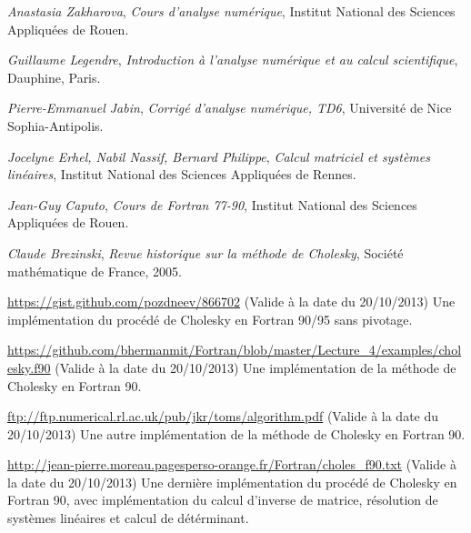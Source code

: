 \documentclass[a4paper, titlepage]{livret}													%
\begin{document}
\begin{thebibliography}{9}

		\emph{Anastasia Zakharova},
		\textit{Cours d'analyse numérique},
		Institut National des Sciences Appliquées de Rouen.

		\emph{Guillaume Legendre},
		\textit{Introduction à l'analyse numérique et au calcul scientifique},
		Dauphine, Paris.

		\emph{Pierre-Emmanuel Jabin},
		\textit{Corrigé d'analyse numérique, TD6},
		Université de Nice Sophia-Antipolis.

		\emph{Jocelyne Erhel, Nabil Nassif, Bernard Philippe},
		\textit{Calcul matriciel et systèmes linéaires},
		Institut National des Sciences Appliquées de Rennes.

		\emph{Jean-Guy Caputo},
		\textit{Cours de Fortran 77-90},
		Institut National des Sciences Appliquées de Rouen.

		\emph{Claude Brezinski},
		\textit{Revue historique sur la méthode de Cholesky},
		Société mathématique de France, 2005.

		\url{https://gist.github.com/pozdneev/866702}
		(Valide à la date du 20/10/2013)
		Une implémentation du procédé de Cholesky en Fortran 90/95 sans pivotage.

		\url{https://github.com/bhermanmit/Fortran/blob/master/Lecture_4/examples/cholesky.f90}
		(Valide à la date du 20/10/2013)
		Une implémentation de la méthode de Cholesky en Fortran 90.

		\url{ftp://ftp.numerical.rl.ac.uk/pub/jkr/toms/algorithm.pdf}
		(Valide à la date du 20/10/2013)
		Une autre implémentation de la méthode de Cholesky en Fortran 90.

		\url{http://jean-pierre.moreau.pagesperso-orange.fr/Fortran/choles_f90.txt}
		(Valide à la date du 20/10/2013)
		Une dernière implémentation du procédé de Cholesky en Fortran 90, avec implémentation du calcul d'inverse de matrice, résolution de systèmes linéaires et calcul de détérminant.
	


\end{thebibliography}
\end{document}
